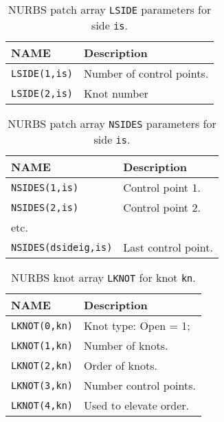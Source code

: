 \begin{table}[!h]
\begin{center}
\begin{tabular}{| l || p{4in} | |} \hline
NAME & Description \\ \hline
{\tt LSIDE(1,is)}  & Number of control points. \\ 
{\tt LSIDE(2,is)}  & Knot number \\ \hline 
\end{tabular}
\caption{NURBS patch array \texttt{LSIDE} parameters for side \texttt{is}.
\label{tabin3} }
\end{center}
\end{table}

\begin{table}[!h]
\begin{center}
\begin{tabular}{| l || p{4in} | |} \hline
NAME & Description \\ \hline
{\tt NSIDES(1,is)}  & Control point 1. \\ 
{\tt NSIDES(2,is)}  & Control point 2.\\
etc. &  \\
{\tt NSIDES(dsideig,is)} & Last control point. \\ \hline
\end{tabular}
\caption{NURBS patch array \texttt{NSIDES} parameters for side \texttt{is}.
\label{tabin4} }
\end{center}
\end{table}

\begin{table}
\begin{center}
\begin{tabular}{| l || p{4in} | |} \hline
NAME & Description \\ \hline
{\tt LKNOT(0,kn)}  & Knot type: Open = 1; \\
{\tt LKNOT(1,kn)}  & Number of knots. \\ 
{\tt LKNOT(2,kn)}  & Order of knots. \\
{\tt LKNOT(3,kn)}  & Number control points. \\ 
{\tt LKNOT(4,kn)}  & Used to elevate order. \\ \hline 
\end{tabular}
\caption{NURBS knot array \texttt{LKNOT} for knot \texttt{kn}.
\label{tabin5} }
\end{center}
\end{table}

